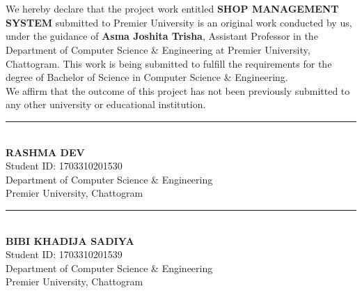 \section*{}
\vspace{2cm}


We hereby declare that the project work entitled \textbf{SHOP MANAGEMENT SYSTEM} submitted to Premier University is an original work conducted by us, under the guidance of \textbf{Asma Joshita Trisha}, Assistant Professor in the Department of Computer Science \& Engineering at Premier University, Chattogram. This work is being submitted to fulfill the requirements for the degree of Bachelor of Science in Computer Science \& Engineering.\\[4ex]
We affirm that the outcome of this project has not been previously submitted to any other university or educational institution.
\vspace{2cm}


\begin{flushleft}
\rule{7cm}{0.4pt} \\
\textbf{RASHMA DEV} \\[1ex]
Student ID: 1703310201530 \\[1ex]
Department of Computer Science \& Engineering \\[1ex]
Premier University, Chattogram\\[1ex]
\end{flushleft}
\vspace{1cm}


\begin{flushleft}
\rule{7cm}{0.4pt} \\
\textbf{BIBI KHADIJA SADIYA} \\[1ex]
Student ID: 1703310201539 \\[1ex]
Department of Computer Science \& Engineering \\[1ex]
Premier University, Chattogram\\[1ex]
\end{flushleft}


